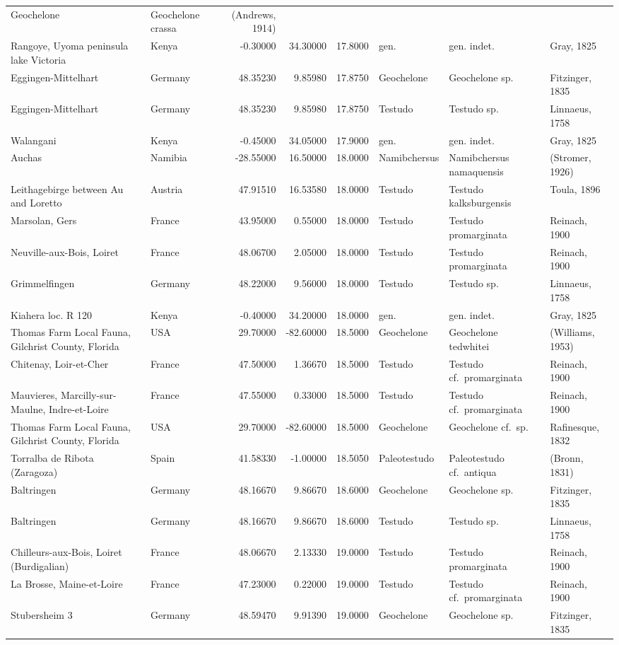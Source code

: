 \documentclass[]{article}
\begin{document}
\begin{longtable}[]{@{}llrrrlll@{}}
Geochelone & Geochelone crassa & (Andrews, 1914)\tabularnewline
Rangoye, Uyoma peninsula lake Victoria & Kenya & -0.30000 & 34.30000 &
17.8000 & gen. & gen. indet. & Gray, 1825\tabularnewline
Eggingen-Mittelhart & Germany & 48.35230 & 9.85980 & 17.8750 &
Geochelone & Geochelone sp. & Fitzinger, 1835\tabularnewline
Eggingen-Mittelhart & Germany & 48.35230 & 9.85980 & 17.8750 & Testudo &
Testudo sp. & Linnaeus, 1758\tabularnewline
Walangani & Kenya & -0.45000 & 34.05000 & 17.9000 & gen. & gen. indet. &
Gray, 1825\tabularnewline
Auchas & Namibia & -28.55000 & 16.50000 & 18.0000 & Namibchersus &
Namibchersus namaquensis & (Stromer, 1926)\tabularnewline
Leithagebirge between Au and Loretto & Austria & 47.91510 & 16.53580 &
18.0000 & Testudo & Testudo kalksburgensis & Toula, 1896\tabularnewline
Marsolan, Gers & France & 43.95000 & 0.55000 & 18.0000 & Testudo &
Testudo promarginata & Reinach, 1900\tabularnewline
Neuville-aux-Bois, Loiret & France & 48.06700 & 2.05000 & 18.0000 &
Testudo & Testudo promarginata & Reinach, 1900\tabularnewline
Grimmelfingen & Germany & 48.22000 & 9.56000 & 18.0000 & Testudo &
Testudo sp. & Linnaeus, 1758\tabularnewline
Kiahera loc. R 120 & Kenya & -0.40000 & 34.20000 & 18.0000 & gen. & gen.
indet. & Gray, 1825\tabularnewline
Thomas Farm Local Fauna, Gilchrist County, Florida & USA & 29.70000 &
-82.60000 & 18.5000 & Geochelone & Geochelone tedwhitei & (Williams,
1953)\tabularnewline
Chitenay, Loir-et-Cher & France & 47.50000 & 1.36670 & 18.5000 & Testudo
& Testudo cf.~promarginata & Reinach, 1900\tabularnewline
Mauvieres, Marcilly-sur-Maulne, Indre-et-Loire & France & 47.55000 &
0.33000 & 18.5000 & Testudo & Testudo cf.~promarginata & Reinach,
1900\tabularnewline
Thomas Farm Local Fauna, Gilchrist County, Florida & USA & 29.70000 &
-82.60000 & 18.5000 & Geochelone & Geochelone cf.~sp. & Rafinesque,
1832\tabularnewline
Torralba de Ribota (Zaragoza) & Spain & 41.58330 & -1.00000 & 18.5050 &
Paleotestudo & Paleotestudo cf.~antiqua & (Bronn, 1831)\tabularnewline
Baltringen & Germany & 48.16670 & 9.86670 & 18.6000 & Geochelone &
Geochelone sp. & Fitzinger, 1835\tabularnewline
Baltringen & Germany & 48.16670 & 9.86670 & 18.6000 & Testudo & Testudo
sp. & Linnaeus, 1758\tabularnewline
Chilleurs-aux-Bois, Loiret (Burdigalian) & France & 48.06670 & 2.13330 &
19.0000 & Testudo & Testudo promarginata & Reinach, 1900\tabularnewline
La Brosse, Maine-et-Loire & France & 47.23000 & 0.22000 & 19.0000 &
Testudo & Testudo cf.~promarginata & Reinach, 1900\tabularnewline
Stubersheim 3 & Germany & 48.59470 & 9.91390 & 19.0000 & Geochelone &
Geochelone sp. & Fitzinger, 1835\tabularnewline

\end{longtable}
\end{document}
